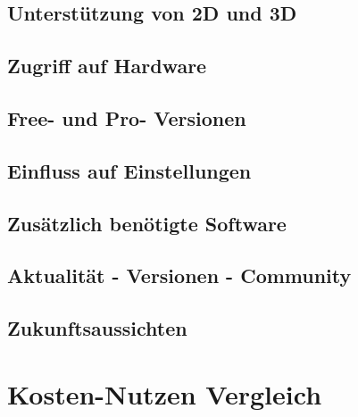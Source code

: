 \section{Unterstützung von 2D und 3D}
\section{Zugriff auf Hardware}%
\section{Free- und Pro- Versionen}
\section{Einfluss auf Einstellungen}
\section{Zusätzlich benötigte Software}
\section{Aktualität - Versionen - Community}
\section{Zukunftsaussichten}


\chapter{Kosten-Nutzen Vergleich}


